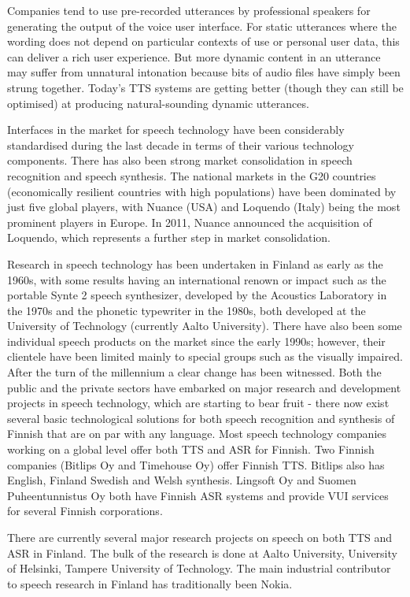 \documentclass[]{../../metanetpaper}
\begin{document}
\begin{Parallel}[c]{70mm}{70mm}
{Companies tend to use pre-recorded utterances by professional speakers for
generating the output of the voice user interface. For static utterances where
the wording does not depend on particular contexts of use or personal user
data, this can deliver a rich user experience. But more dynamic content in an
utterance may suffer from unnatural intonation because bits of audio files have
simply been strung together. Today’s TTS systems are getting better (though
they can still be optimised) at producing natural-sounding dynamic utterances.

Interfaces in the market for speech technology have been
considerably standardised during the last decade in terms of their various
technology components. There has also been strong market consolidation in
speech recognition and speech synthesis. The national markets in the G20
countries (economically resilient countries with high populations) have been
dominated by just five global players, with Nuance (USA) and Loquendo (Italy)
being the most prominent players in Europe. In 2011, Nuance announced the
acquisition of Loquendo, which represents a further step in market
consolidation.

Research in speech technology has been undertaken in Finland as early as the
1960s, with some results having an international renown or impact such as the
portable Synte 2 speech synthesizer, developed by the Acoustics Laboratory in
the 1970s and the phonetic typewriter in the 1980s, both developed at the
University of Technology (currently Aalto University). There have also been
some individual speech products on the market since the early 1990s; however,
their clientele have been limited mainly to special groups such as the visually
impaired. After the turn of the millennium a clear change has been witnessed.
Both the public and the private sectors have embarked on major research and
development projects in speech technology, which are starting to bear fruit -
there now exist several basic technological solutions for both speech
recognition and synthesis of Finnish that are on par with any language. Most
speech technology companies working on a global level offer both TTS and ASR
for Finnish. Two Finnish companies (Bitlips Oy and Timehouse Oy) offer Finnish
TTS. Bitlips also has English, Finland Swedish and Welsh synthesis. Lingsoft Oy
and Suomen Puheentunnistus Oy both have Finnish ASR systems and provide VUI
services for several Finnish corporations.

There are currently several major research projects on speech on both TTS and
ASR in Finland. The bulk of the research is done at Aalto University,
University of Helsinki, Tampere University of Technology. The main industrial
contributor to speech research in Finland has traditionally been Nokia.

}
\end{Parallel}
\end{document}
